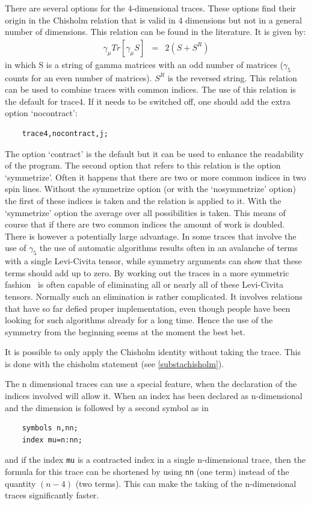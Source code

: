 There are several options for the 4-dimensional traces. These options find 
their origin in the Chisholm relation that is valid in 4 
dimensions but not in a general number of dimensions. This relation can be 
found in the literature. It is given by:
\begin{eqnarray}
    \gamma_\mu Tr[\gamma_\mu S] & = & 2(S + S^R) \nonumber
\end{eqnarray}
\noindent in which S is a string of gamma matrices with an odd number of 
matrices ($\gamma_5$ counts for an even number of matrices). $S^R$ is the 
reversed string. This relation can be used to combine traces with common 
indices. The use of this relation is the default for trace4. 
If it needs to be switched off, one should add the extra option
`nocontract':
\begin{verbatim}
    trace4,nocontract,j;
\end{verbatim}
The option `contract' is the default but it can be used to 
enhance the readability of the program. The second option that refers to 
this relation is the option `symmetrize'. Often it 
happens that there are two or more common indices in two spin lines. 
Without the symmetrize option (or with the 
`nosymmetrize' option) the first of these indices is 
taken and the relation is applied to it. With the `symmetrize' option 
the average over all possibilities is taken. This means of course that if 
there are two common indices the amount of work is doubled. There is 
however a potentially large advantage. In some traces that involve the use of 
$\gamma_5$ the use of automatic algorithms results often in an avalanche of 
terms with a single Levi-Civita tensor, while symmetry arguments can show 
that these terms should add up to zero. By working out the traces in a more 
symmetric fashion \FORM\ is often capable of eliminating all or nearly all of 
these Levi-Civita tensors. Normally such an elimination is rather 
complicated. It involves relations that have so far defied proper 
implementation, even though people have been looking for such algorithms 
already for a long time. Hence the use of the symmetry from the beginning 
seems at the moment the best bet.

It is possible to only apply the Chisholm identity without 
taking the trace. This is done with the chisholm statement (see 
\ref{substachisholm}). 

The n dimensional traces can use a special feature, when the declaration 
of the indices involved will allow it. When an index has been declared 
as n-dimensional and the dimension is followed by a second symbol as in
\begin{verbatim}
    symbols n,nn;
    index mu=n:nn;
\end{verbatim}
and if the index \verb:mu: is a contracted index in a single 
n-dimensional trace, then the formula for this trace can be shortened by 
using \verb:nn: (one term) instead of the quantity $(n-4)$ (two terms). 
This can make the taking of the n-dimensional traces significantly 
faster.

